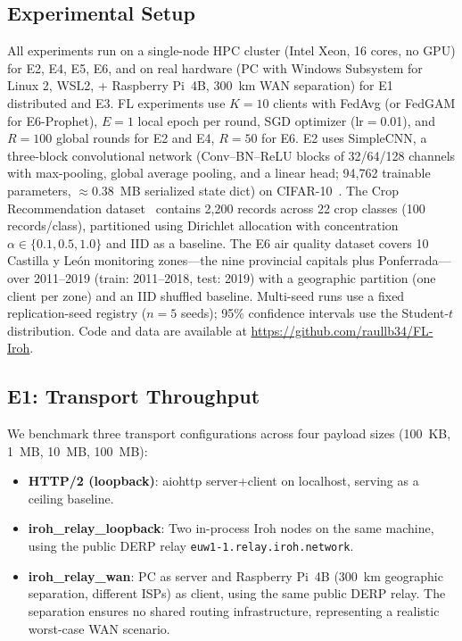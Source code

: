 \documentclass[a4paper,fleqn]{cas-dc}
\begin{document}
\subsection{Experimental Setup}

All experiments run on a single-node HPC cluster (Intel Xeon, 16 cores, no GPU) for E2, E4, E5, E6, and on real hardware (PC with Windows Subsystem for Linux 2, WSL2, + Raspberry Pi~4B, 300~km WAN separation) for E1 distributed and E3. FL experiments use $K{=}10$ clients with FedAvg (or FedGAM for E6-Prophet), $E{=}1$ local epoch per round, SGD optimizer (lr$=$0.01), and $R{=}100$ global rounds for E2 and E4, $R{=}50$ for E6. E2 uses SimpleCNN, a three-block convolutional network (Conv--BN--ReLU blocks of 32/64/128 channels with max-pooling, global average pooling, and a linear head; 94{,}762 trainable parameters, $\approx$0.38~MB serialized state dict) on CIFAR-10~\cite{cifar2009}. The Crop Recommendation dataset~\cite{cropdataset} contains 2,200 records across 22 crop classes (100 records/class), partitioned using Dirichlet allocation with concentration $\alpha \in \{0.1, 0.5, 1.0\}$ and IID as a baseline. The E6 air quality dataset covers 10 Castilla y Le\'on monitoring zones---the nine provincial capitals plus Ponferrada---over 2011--2019 (train: 2011--2018, test: 2019) with a geographic partition (one client per zone) and an IID shuffled baseline. Multi-seed runs use a fixed replication-seed registry ($n{=}5$ seeds); 95\% confidence intervals use the Student-$t$ distribution. Code and data are available at \url{https://github.com/raullb34/FL-Iroh}.

\subsection{E1: Transport Throughput}
\label{sec:e1}

We benchmark three transport configurations across four payload sizes (100~KB, 1~MB, 10~MB, 100~MB):

\begin{itemize}
    \item \textbf{HTTP/2 (loopback)}: aiohttp server+client on localhost, serving as a ceiling baseline.
    \item \textbf{iroh\_relay\_loopback}: Two in-process Iroh nodes on the same machine, using the public DERP relay \texttt{euw1-1.relay.iroh.network}.
    \item \textbf{iroh\_relay\_wan}: PC as server and Raspberry Pi~4B (300~km geographic separation, different ISPs) as client, using the same public DERP relay. The separation ensures no shared routing infrastructure, representing a realistic worst-case WAN scenario.
\end{itemize}
\end{document}
